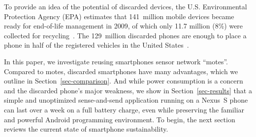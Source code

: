 To provide an idea of the potential of discarded devices, the U.S.
Environmental Protection Agency (EPA) estimates that 141~million mobile
devices became ready for end-of-life management in 2009, of which only 11.7
million (8\%) were collected for recycling~\cite{epa-ewasteweb}. The
129~million discarded phones are enough to place a phone in half of the registered vehicles
in the United States~\cite{dot-cars}. 

In this paper, we investigate reusing smartphones sensor network ``motes''.
Compared to motes, discarded smartphones have many advantages, which we
outline in Section~\ref{sec-comparison}. And while power consumption is a
concern and the discarded phone's major weakness, we show in
Section~\ref{sec-results} that a simple and unoptimized sense-and-send
application running on a Nexus~S phone can last over a week on a full battery
charge, even while preserving the familiar and powerful Android programming
environment. To begin, the next section reviews the current state of
smartphone sustainability.
